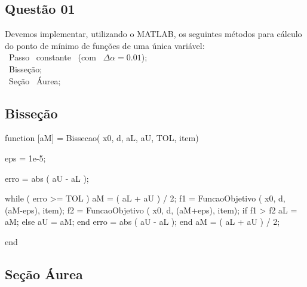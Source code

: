 \documentclass[a4paper, 12pt]{article}
\begin{document}
\begin{titlepage}
\newpage


\newpage

\listoffigures
\thispagestyle{empty}

\newpage

\newpage

\thispagestyle{empty}

\newpage


\section{Questão 01}
Devemos implementar, utilizando o MATLAB, os seguintes métodos para cálculo do ponto de mínimo de funções de uma única variável: \\


\bullet \>\ Passo \>\ constante \>\ (com \>\ $\Delta \alpha = 0.01$);\\
\bullet \>\ Bisseção;\\
\bullet \>\ Seção \>\ Áurea;\\


\subsection{Bisseção}

\sloppy
{}
\graphicspath{ {./L01_Latex_images/} }


\begin{matlabcode}

function [aM] = Bissecao( x0, d, aL, aU, TOL, item)

eps = 1e-5;

erro = abs ( aU - aL );

while ( erro >= TOL )
    aM = ( aL + aU ) / 2;   
    f1 = FuncaoObjetivo ( x0, d, (aM-eps), item);
    f2 = FuncaoObjetivo ( x0, d, (aM+eps), item);
	if f1 > f2
        aL = aM;
    else
        aU = aM;
    end
    erro = abs ( aU - aL );
end
aM = ( aL + aU ) / 2;

end

\end{matlabcode}

\subsection{Seção Áurea}


\end{titlepage}
\end{document}
